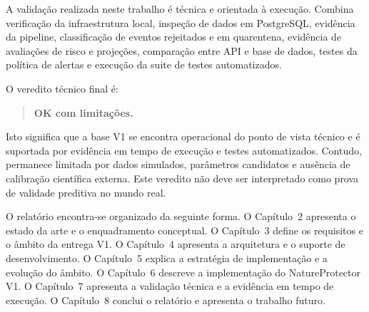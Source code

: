 A validação realizada neste trabalho é técnica e orientada à execução. Combina verificação da infraestrutura local, inspeção de dados em PostgreSQL, evidência da pipeline, classificação de eventos rejeitados e em quarentena, evidência de avaliações de risco e projeções, comparação entre API e base de dados, testes da política de alertas e execução da suite de testes automatizados.

O veredito técnico final é:

\begin{quote}
\textbf{OK com limitações.}
\end{quote}

Isto significa que a base V1 se encontra operacional do ponto de vista técnico e é suportada por evidência em tempo de execução e testes automatizados. Contudo, permanece limitada por dados simulados, parâmetros candidatos e ausência de calibração científica externa. Este veredito não deve ser interpretado como prova de validade preditiva no mundo real.

O relatório encontra-se organizado da seguinte forma. O Capítulo~2 apresenta o estado da arte e o enquadramento conceptual. O Capítulo~3 define os requisitos e o âmbito da entrega V1. O Capítulo~4 apresenta a arquitetura e o suporte de desenvolvimento. O Capítulo~5 explica a estratégia de implementação e a evolução do âmbito. O Capítulo~6 descreve a implementação do NatureProtector V1. O Capítulo~7 apresenta a validação técnica e a evidência em tempo de execução. O Capítulo~8 conclui o relatório e apresenta o trabalho futuro.